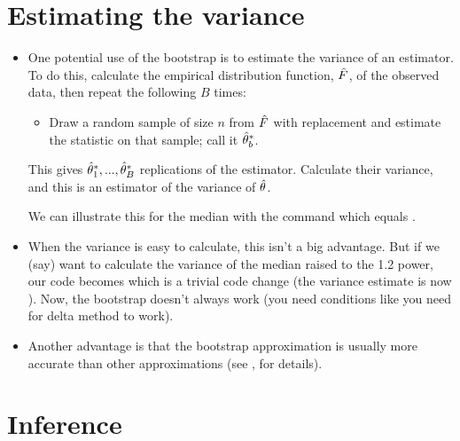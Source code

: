 \section{Estimating the variance}

\begin{itemize}[leftmargin=0pt]

\item One potential use of the bootstrap is to estimate the variance
  of an estimator.  To do this, calculate the empirical distribution
  function, $\hat{F}$, of the observed data, then repeat the following $B$
  times:
  \begin{itemize}
  \item Draw a random sample of size $n$ from $\hat{F}$ with replacement
    and estimate the statistic on that sample; call it $\hat{\theta}^*_b$.
  \end{itemize}
  This gives $\hat{\theta}^*_1,...,\hat{\theta}^*_B$ replications of the estimator.
  Calculate their variance, and this is an estimator of the variance
  of $\hat{\theta}$.

  We can illustrate this for the median with the command
  \renewcommand*\FancyVerbStartString{## block 4}
  which equals \medv.

\item When the variance is easy to calculate, this isn't a big
  advantage.  But if we (say) want to calculate the variance of the
  median raised to the 1.2 power, our code becomes
  \renewcommand*\FancyVerbStartString{## block 5}
  which is a trivial code change (the variance estimate is now \powv).
  Now, the bootstrap doesn't always work (you need conditions like you
  need for delta method to work).

\item Another advantage is that the bootstrap approximation is usually
  more accurate than other approximations (see \citealp{Hal91}, for
  details).

\end{itemize}

\section{Inference}

